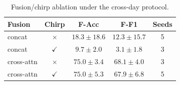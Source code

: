 \begin{table}[!t]
\centering
\caption{Fusion/chirp ablation under the cross-day protocol.}
\label{tab:fusion_chirp}
\footnotesize
\setlength{\tabcolsep}{3.5pt}
\renewcommand{\arraystretch}{1.05}
\begin{tabular}{@{}lcccc@{}}
\toprule
Fusion & Chirp & F-Acc & F-F1 & Seeds \\
\midrule
concat & $\times$ & $18.3{\pm}18.6$ & $12.3{\pm}15.7$ & 5 \\
concat & $\checkmark$ & $9.7{\pm}2.0$ & $3.1{\pm}1.8$ & 3 \\
cross-attn & $\times$ & $75.0{\pm}3.4$ & $68.1{\pm}4.0$ & 3 \\
cross-attn & $\checkmark$ & $\mathbf{75.0{\pm}5.3}$ & $\mathbf{67.9{\pm}6.8}$ & 5 \\
\bottomrule
\end{tabular}
\end{table}
